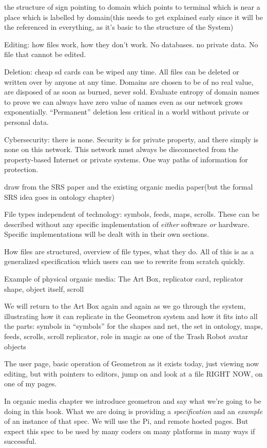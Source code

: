the structure of sign pointing to domain which points to terminal which
is near a place which is labelled by domain(this needs to get explained
early since it will be the referenced in everything, as it's basic to
the structure of the System)

Editing: how files work, how they don't work. No databases. no private
data. No file that cannot be edited.

Deletion: cheap sd cards can be wiped any time. All files can be deleted
or written over by anyone at any time. Domains are chosen to be of no
real value, are disposed of as soon as burned, never sold. Evaluate
entropy of domain names to prove we can always have zero value of names
even as our network grows exponentially. ``Permanent'' deletion less
critical in a world without private or personal data.

Cybersecurity: there is none. Security is for private property, and
there simply is none on this network. This network must always be
disconnected from the property-based Internet or private systems. One
way paths of information for protection.

draw from the SRS paper and the existing organic media paper(but the
formal SRS idea goes in ontology chapter)

File types independent of technology: symbols, feeds, maps, scrolls.
These can be described without any specific implementation of
\emph{either} software \emph{or} hardware. Specific implementations will
be dealt with in their own sections.

How files are structured, overview of file types, what they do. All of
this is as a generalized specification which users can use to rewrite
from scratch quickly.

Example of physical organic media: The Art Box, replicator card,
replicator shape, object itself, scroll

We will return to the Art Box again and again as we go through the
system, illustrating how it can replicate in the Geometron system and
how it fits into all the parts: symbols in ``symbols'' for the shapes
and net, the set in ontology, maps, feeds, scrolls, scroll replicator,
role in magic as one of the Trash Robot avatar objects

The user page, basic operation of Geometron as it exists today, just
viewing now editing, but with pointers to editors, jump on and look at a
file RIGHT NOW, on one of my pages.

In organic media chapter we introduce geometron and say what we're going
to be doing in this book. What we are doing is providing a
\emph{specification} and an \emph{example} of an instance of that spec.
We will use the Pi, and remote hosted pages. But expect this spec to be
used by many coders on many platforms in many ways if successful.

